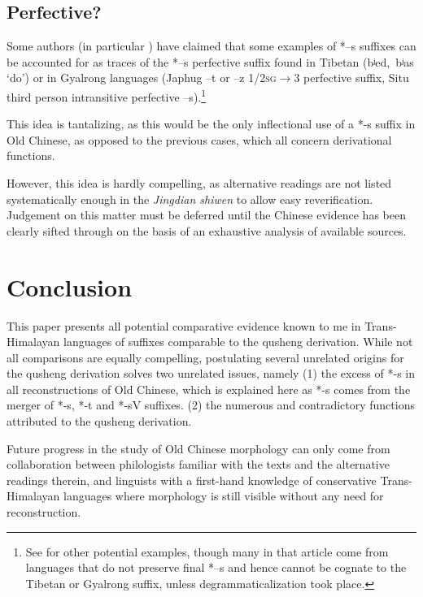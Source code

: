 \documentclass[oldfontcommands,oneside,a4paper,11pt]{article}
\newcommand{\ipa}[1]{{\phon \mbox{#1}}} %
\begin{document}
\subsection{Perfective?} \label{sec:perf}
Some authors (in particular \citealt{jinlx06}) have claimed that some examples of *\ipa{--s} suffixes can be accounted for as traces of the *\ipa{--s} perfective suffix found in Tibetan (\ipa{bʲed, bʲas} `do') or in Gyalrong languages (Japhug \ipa{--t} or \ipa{--z} \textsc{1/2sg}$\rightarrow$3 perfective suffix, Situ third person intransitive perfective \ipa{--s}).\footnote{See \citet{huangbf97s.houzhui} for other potential examples, though many in that article come from languages that do not preserve final *\ipa{--s} and hence cannot be cognate to the Tibetan or Gyalrong suffix, unless degrammaticalization took place.}

This idea is tantalizing, as this would be the only inflectional use of a *\ipa{-s} suffix in Old Chinese, as opposed to the previous cases, which all concern derivational functions.

However, this idea is hardly compelling, as alternative readings are not listed systematically enough in the \textit{Jingdian shiwen} to allow easy reverification. Judgement on this matter must be deferred until the Chinese evidence has been clearly sifted through on the basis of an exhaustive analysis of available sources.

\section{Conclusion}
This paper presents all potential comparative evidence known to me in Trans-Himalayan languages of suffixes comparable to the qusheng derivation. While not all comparisons are equally compelling, postulating several unrelated origins for the qusheng derivation solves two unrelated issues, namely (1) the excess of *\ipa{-s} in all reconstructions of Old Chinese, which is explained here as *\ipa{-s} comes from the merger of *\ipa{-s}, *\ipa{-t} and *\ipa{-sV} suffixes. (2) the numerous and contradictory functions attributed to the qusheng derivation.

Future progress in the study of Old Chinese morphology can only come from collaboration between philologists familiar with the texts and the alternative readings therein, and linguists with a first-hand knowledge of conservative Trans-Himalayan languages where morphology is still visible without any need for reconstruction.



\end{document}
